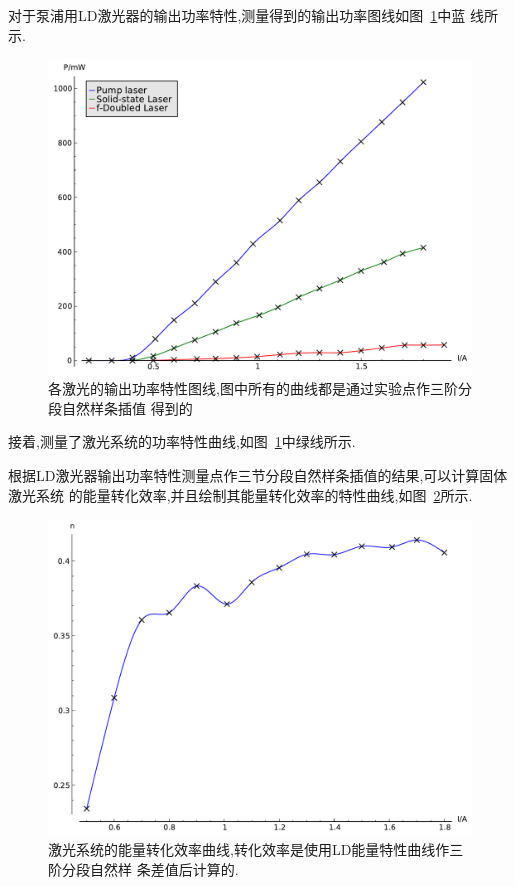 \documentclass[aps,pre,12pt,preprint,onecolumn,showpacs,showkeys]{revtex4-1}
\begin{document}
对于泵浦用LD激光器的输出功率特性,测量得到的输出功率图线如图~\ref{fig:plotIP}中蓝
线所示.

\begin{figure}[htbp]
    \includegraphics[width=\textwidth]{plot1.pdf}
    \caption{\label{fig:plotIP}%
        各激光的输出功率特性图线,图中所有的曲线都是通过实验点作三阶分段自然样条插值
        得到的}
\end{figure}

接着,测量了激光系统的功率特性曲线,如图~\ref{fig:plotIP}中绿线所示.

根据LD激光器输出功率特性测量点作三节分段自然样条插值的结果,可以计算固体激光系统
的能量转化效率,并且绘制其能量转化效率的特性曲线,如图~\ref{fig:plotn1}所示.

\begin{figure}[htbp]
    \includegraphics[width=\textwidth]{plot2.pdf}
    \caption{\label{fig:plotn1}%
        激光系统的能量转化效率曲线,转化效率是使用LD能量特性曲线作三阶分段自然样
        条差值后计算的.
    }
\end{figure}
\end{document}
